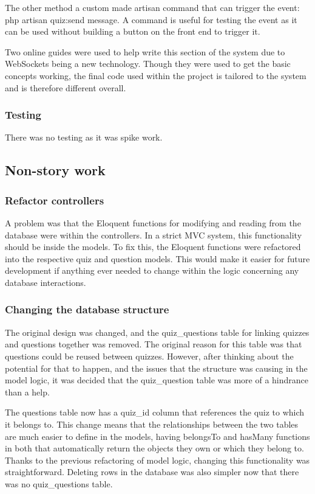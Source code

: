 The other method a custom made artisan command that can trigger the event: php artisan quiz:send {message}. A command is useful for testing the event as it can be used without building a button on the front end to trigger it.

Two online guides were used to help write this section of the system due to WebSockets being a new technology\cite{pusher-guide}\cite{echo-guide}. Though they were used to get the basic concepts working, the final code used within the project is tailored to the system and is therefore different overall.
\subsubsection{Testing}
There was no testing as it was spike work.
\newpage

\subsection{Non-story work}
\subsubsection{Refactor controllers}
A problem was that the Eloquent functions for modifying and reading from the database were within the controllers. In a strict MVC system, this functionality should be inside the models. To fix this, the Eloquent functions were refactored into the respective quiz and question models. This would make it easier for future development if anything ever needed to change within the logic concerning any database interactions.
\subsubsection{Changing the database structure}
The original design was changed, and the quiz\_questions table for linking quizzes and questions together was removed. The original reason for this table was that questions could be reused between quizzes. However, after thinking about the potential for that to happen, and the issues that the structure was causing in the model logic, it was decided that the quiz\_question table was more of a hindrance than a help.

The questions table now has a quiz\_id column that references the quiz to which it belongs to. This change means that the relationships between the two tables are much easier to define in the models, having belongsTo and hasMany functions in both that automatically return the objects they own or which they belong to. Thanks to the previous refactoring of model logic, changing this functionality was straightforward. Deleting rows in the database was also simpler now that there was no quiz\_questions table. 

